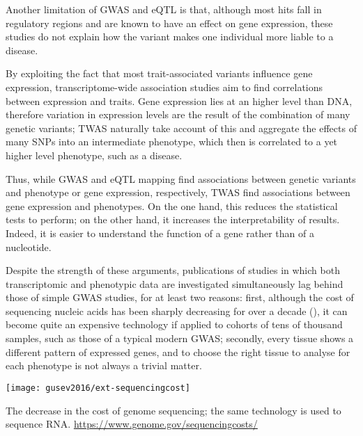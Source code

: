 \documentclass[../main.tex]{subfiles}
\begin{document}
Another limitation of GWAS and eQTL is that, although most hits fall in 
regulatory regions and are known to have an effect on gene expression, 
these studies do not explain how the variant makes one individual more 
liable to a disease. 


By exploiting the fact that most trait-associated variants influence 
gene expression, transcriptome-wide association studies aim to find 
correlations between expression and traits. Gene expression lies at an 
higher level than DNA, therefore variation in expression levels are the 
result of the combination of many genetic variants; TWAS naturally take 
account of this and aggregate the effects of many SNPs into an 
intermediate phenotype, which then is correlated to a yet higher level 
phenotype, such as a disease.

Thus, while GWAS and eQTL mapping find associations between genetic 
variants and phenotype or gene expression, respectively, TWAS find 
associations between gene expression and phenotypes. On the one hand, 
this reduces the statistical tests to perform; on the other hand, it 
increases the interpretability of results. Indeed, it is easier to 
understand the function of a gene rather than of a nucleotide.

Despite the strength of these arguments, publications of studies in 
which both transcriptomic and phenotypic data are investigated 
simultaneously lag behind those of simple GWAS studies, for at least two 
reasons: first, although the cost of sequencing nucleic acids has been 
sharply decreasing for over a decade (), it can 
become quite an expensive technology if applied to cohorts of tens of 
thousand samples, such as those of a typical modern GWAS; secondly, 
every tissue shows a different pattern of expressed genes, and to choose 
the right tissue to analyse for each phenotype is not always a trivial 
matter.

\begin{marginfigure}[-4cm]
	\texttt{[image: gusev2016/ext-sequencingcost]}
	\caption{The decrease in the cost of genome sequencing; the same 
technology is used to sequence RNA. 
\url{https://www.genome.gov/sequencingcosts/}}
\end{marginfigure}
\end{document}
